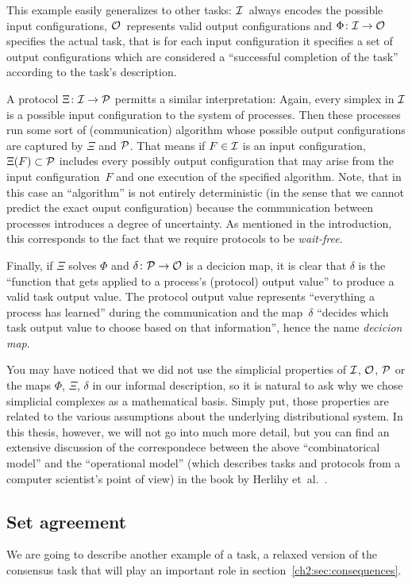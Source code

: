 This example easily generalizes to other tasks:
$\mathcal{I}$~always encodes the possible input configurations,
$\mathcal{O}$~represents valid output configurations and
$\Phi\colon\mathcal{I}\to\mathcal{O}$ specifies the actual task, that is
for each input configuration it specifies a set of output
configurations which are considered a \enquote{successful
completion of the task} according to the task's description.

A protocol $\Xi\colon\mathcal{I}\to\mathcal{P}$ permitts a similar interpretation:
Again, every simplex in $\mathcal{I}$ is a possible input configuration to
the system of processes. Then these processes run some sort of
(communication) algorithm whose possible output configurations are
captured by $\Xi$ and $\mathcal{P}$. That means if $F\in\mathcal{I}$ is an input
configuration, $\Xi(F) \subset \mathcal{P}$ includes every possibly output
configuration that may arise from the input configuration~$F$ and
one execution of the specified algorithm. Note, that in this case
an \enquote{algorithm} is not entirely deterministic (in the sense
that we cannot predict the exact ouput configuration) because the
communication between processes introduces a degree of uncertainty.
As mentioned %
in the introduction, this corresponds to the fact that we require
protocols to be \emph{wait-free}.

Finally, if $\Xi$ solves $\Phi$ and $\delta\colon\mathcal{P}\to\mathcal{O}$ is a decicion
map, it is clear that $\delta$ is the \enquote{function that gets applied
to a process's (protocol) output value} to produce a valid task
output value. The protocol output value represents \enquote{everything
a process has learned} during the communication and the map~$\delta$
\enquote{decides which task output value to choose based on that
information}, hence the name \emph{decicion map}.

You may have noticed that we did not use the simplicial properties of
$\mathcal{I}$, $\mathcal{O}$, $\mathcal{P}$ or the maps $\Phi$, $\Xi$, $\delta$ in our
informal description, so it is natural to ask why we chose simplicial
complexes as a mathematical basis. Simply put, those properties are
related to the various assumptions about the underlying distributional
system. In this thesis, however, we will not go into much more detail,
but you can find an extensive discussion of the correspondece between
the above \enquote{combinatorical model} and the \enquote{operational
model} (which describes tasks and protocols from a computer
scientist's point of view) in the book by
Herlihy et~al.~\cite[Ch.\,4]{bookc:herlihyetal13}.

\subsection{Set agreement}
We are going to describe another example of a task, a relaxed version
of the consensus task  that will play an
important role in section~\ref{ch2:sec:consequences}.


